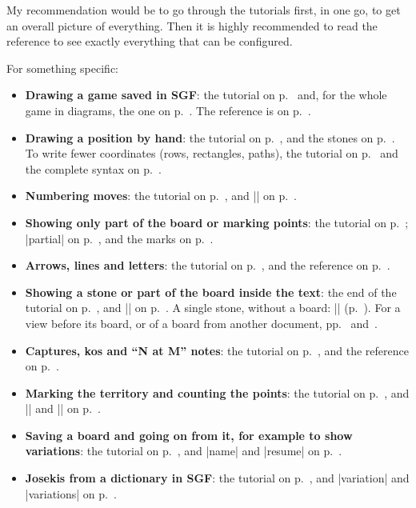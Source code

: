 My recommendation would be to go through the tutorials first, in one go, to get an overall picture of everything. Then it is highly recommended to read the reference to see exactly everything that can be configured.

For something specific:
\begin{itemize}
	\item \textbf{Drawing a game saved in SGF}: the tutorial on p.~\pageref{tut:primera} and, for the whole game in diagrams, the one on p.~\pageref{tut:partida}. The reference is on p.~\pageref{subsec:sgf}.
	\item \textbf{Drawing a position by hand}: the tutorial on p.~\pageref{tut:posicion}, and the stones on p.~\pageref{sec:piedras}. To write fewer coordinates (rows, rectangles, paths), the tutorial on p.~\pageref{tut:abreviar} and the complete syntax on p.~\pageref{subsec:sintaxis-de-coordenadas}.
	\item \textbf{Numbering moves}: the tutorial on p.~\pageref{tut:movimientos}, and |\moves| on p.~\pageref{subsec:movimientos}.
	\item \textbf{Showing only part of the board or marking points}: the tutorial on p.~\pageref{tut:parcial}; |partial| on p.~\pageref{subsec:parcial}, and the marks on p.~\pageref{sec:marcas}.
	\item \textbf{Arrows, lines and letters}: the tutorial on p.~\pageref{tut:pelea}, and the reference on p.~\pageref{subsec:flechas}.
	\item \textbf{Showing a stone or part of the board inside the text}: the end of the tutorial on p.~\pageref{tut:pelea}, and |\pgfgoview| on p.~\pageref{subsec:vistas}. A single stone, without a board: |\pgfgostone| (p.~\pageref{subsec:piedra-texto}). For a view before its board, or of a board from another document, pp.~\pageref{subsec:vistas-antes} and~\pageref{subsec:exportar}.
	\item \textbf{Captures, kos and ``N at M'' notes}: the tutorial on p.~\pageref{tut:ko}, and the reference on p.~\pageref{sec:juego}.
	\item \textbf{Marking the territory and counting the points}: the tutorial on p.~\pageref{tut:territorio}, and |\territory| and |\pgfgoscore| on p.~\pageref{subsec:territorio}.
	\item \textbf{Saving a board and going on from it, for example to show variations}: the tutorial on p.~\pageref{tut:variantes}, and |name| and |resume| on p.~\pageref{subsec:recordar}.
	\item \textbf{Josekis from a dictionary in SGF}: the tutorial on p.~\pageref{tut:josekis}, and |variation| and |variations| on p.~\pageref{subsec:sgf}.

\end{itemize}
